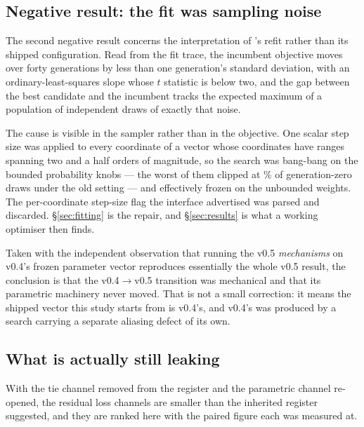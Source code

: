 \subsection{Negative result: the \vfive{} fit was sampling noise}
\label{sec:diag-fitnoise}

The second negative result concerns the interpretation of \vfive{}'s refit rather than its shipped
configuration. Read from the fit trace, the incumbent objective moves over forty generations by
less than one generation's standard deviation, with an ordinary-least-squares slope whose $t$
statistic is below two, and the gap between the best candidate and the incumbent tracks the expected
maximum of a population of independent draws of exactly that noise.

The cause is visible in the sampler rather than in the objective. One scalar step size was applied
to every coordinate of a vector whose coordinates have ranges spanning two and a half orders of
magnitude, so the search was bang-bang on the bounded probability knobs --- the worst of them
clipped at \vsixFitAClipGenZero\% of generation-zero draws under the old setting --- and effectively
frozen on the unbounded weights. The per-coordinate step-size flag the interface advertised was
parsed and discarded. \S\ref{sec:fitting} is the repair, and \S\ref{sec:results} is what a working
optimiser then finds.

Taken with the independent observation that running the v0.5 \emph{mechanisms} on v0.4's frozen
parameter vector reproduces essentially the whole v0.5 result, the conclusion is that the
v0.4$\rightarrow$v0.5 transition was mechanical and that its parametric machinery never moved. That
is not a small correction: it means the shipped vector this study starts from is v0.4's, and v0.4's
was produced by a search carrying a separate aliasing defect of its own.

\subsection{What is actually still leaking}
\label{sec:diag-channels}

With the tie channel removed from the register and the parametric channel re-opened, the residual
loss channels are smaller than the inherited register suggested, and they are ranked here with the
paired figure each was measured at.

